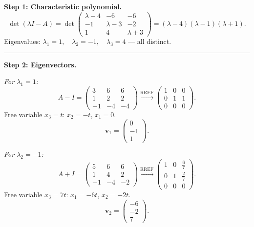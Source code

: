 \documentclass[12pt,a3paper]{article}
\begin{document}
\begin{tcolorbox}[enhanced,breakable,
  colback=cE!4,colframe=cE,boxrule=0.8pt,arc=5pt,
  title={\textbf{Answer --- Eigenvalues, Eigenvectors \& Diagonalization of
    $A=\begin{pmatrix}4&6&6\\1&3&2\\-1&-4&-3\end{pmatrix}$}},
  fonttitle=\bfseries\color{white},colbacktitle=cE]
 
\textbf{Step 1: Characteristic polynomial.}
\[
  \det(\lambda I - A)
  = \det\begin{pmatrix}\lambda-4&-6&-6\\-1&\lambda-3&-2\\1&4&\lambda+3\end{pmatrix}
  = (\lambda-4)(\lambda-1)(\lambda+1).
\]
Eigenvalues: $\boxed{\lambda_1 = 1,\quad \lambda_2 = -1,\quad \lambda_3 = 4}$ — all distinct.
 
\medskip\textcolor{cE}{\rule{\textwidth}{0.4pt}}
 
\textbf{Step 2: Eigenvectors.}
 
\textit{For $\lambda_1 = 1$:}
\[
  A - I = \begin{pmatrix}3&6&6\\1&2&2\\-1&-4&-4\end{pmatrix}
  \xrightarrow{\text{RREF}}
  \begin{pmatrix}1&0&0\\0&1&1\\0&0&0\end{pmatrix}.
\]
Free variable $x_3 = t$: $x_2 = -t$, $x_1 = 0$.
\[
  \mathbf{v}_1 = \begin{pmatrix}0\\-1\\1\end{pmatrix}.
\]
 
\textit{For $\lambda_2 = -1$:}
\[
  A + I = \begin{pmatrix}5&6&6\\1&4&2\\-1&-4&-2\end{pmatrix}
  \xrightarrow{\text{RREF}}
  \begin{pmatrix}1&0&\frac{6}{7}\\0&1&\frac{2}{7}\\0&0&0\end{pmatrix}.
\]
Free variable $x_3 = 7t$: $x_1 = -6t$, $x_2 = -2t$.
\[
  \mathbf{v}_2 = \begin{pmatrix}-6\\-2\\7\end{pmatrix}.
\]
 

\end{tcolorbox}
\end{document}

